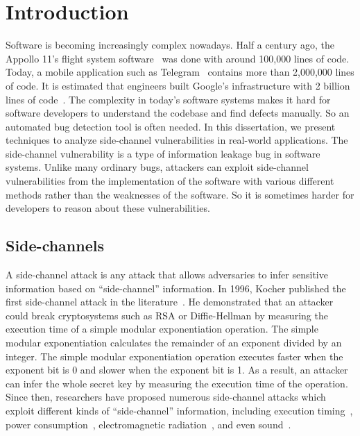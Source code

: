 
\chapter{Introduction} \label{chapter1}
Software is becoming increasingly complex nowadays. Half a century ago, the Appollo 11's flight system software~\cite{hamilton19690apollo} was done with around 100,000 lines of code. 
Today, a mobile application such as Telegram~\cite{telegram} contains more than 2,000,000 lines of code. It is estimated that engineers built Google's infrastructure with 2 billion lines of code~\cite{potvin2016google}. The complexity in today's software systems makes it hard for software developers to understand the codebase and find defects manually. So an automated bug detection tool is often needed. In this dissertation, we present techniques to analyze side-channel vulnerabilities in real-world applications. The side-channel vulnerability is a type of information leakage bug in software systems. Unlike many ordinary bugs, attackers can exploit side-channel vulnerabilities from the implementation of the software with various different methods rather than the weaknesses of the software. So it is sometimes harder for developers to reason about these vulnerabilities.

\section{Side-channels}
A side-channel attack is any attack that allows adversaries to infer sensitive information based on ``side-channel'' information. In 1996, Kocher published the first side-channel attack in the literature~\cite{kocher1996timing}. He demonstrated that an attacker could break cryptosystems such as RSA or Diffie-Hellman by measuring the execution time of a simple modular exponentiation operation. The simple modular exponentiation calculates the remainder of an exponent divided by an integer.  The simple modular exponentiation operation executes faster when the exponent bit is 0 and slower when the exponent bit is 1. As a result, an attacker can infer the whole secret key by measuring the execution time of the operation. Since then, researchers have proposed numerous side-channel attacks which exploit different kinds of ``side-channel'' information, including execution timing~\cite{184415,disselkoen2017prime+,7163050}, power consumption~\cite{kar20178}, electromagnetic radiation~\cite{agrawal2002side,217605}, and even sound~\cite{chari1999towards}. 

